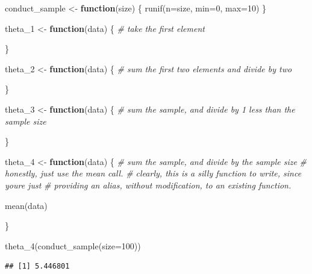 \documentclass[
]{article}
\newenvironment{Shaded}{\begin{snugshade}}{\end{snugshade}}
\newcommand{\AttributeTok}[1]{\textcolor[rgb]{0.77,0.63,0.00}{#1}}
\newcommand{\CommentTok}[1]{\textcolor[rgb]{0.56,0.35,0.01}{\textit{#1}}}
\newcommand{\ControlFlowTok}[1]{\textcolor[rgb]{0.13,0.29,0.53}{\textbf{#1}}}
\newcommand{\DecValTok}[1]{\textcolor[rgb]{0.00,0.00,0.81}{#1}}
\newcommand{\FunctionTok}[1]{\textcolor[rgb]{0.00,0.00,0.00}{#1}}
\newcommand{\NormalTok}[1]{#1}
\newcommand{\OtherTok}[1]{\textcolor[rgb]{0.56,0.35,0.01}{#1}}
\begin{document}
\begin{Shaded}
\begin{Highlighting}[]
\NormalTok{conduct\_sample }\OtherTok{\textless{}{-}} \ControlFlowTok{function}\NormalTok{(size) \{ }
  \FunctionTok{runif}\NormalTok{(}\AttributeTok{n=}\NormalTok{size, }\AttributeTok{min=}\DecValTok{0}\NormalTok{, }\AttributeTok{max=}\DecValTok{10}\NormalTok{)}
\NormalTok{\}}
\end{Highlighting}
\end{Shaded}

\begin{Shaded}
\begin{Highlighting}[]
\NormalTok{theta\_1 }\OtherTok{\textless{}{-}} \ControlFlowTok{function}\NormalTok{(data) \{ }
  \CommentTok{\# take the first element}
  
\NormalTok{\}}

\NormalTok{theta\_2 }\OtherTok{\textless{}{-}} \ControlFlowTok{function}\NormalTok{(data) \{ }
  \CommentTok{\# sum the first two elements and divide by two}
  
\NormalTok{\}}

\NormalTok{theta\_3 }\OtherTok{\textless{}{-}} \ControlFlowTok{function}\NormalTok{(data) \{ }
  \CommentTok{\# sum the sample, and divide by 1 less than the sample size}
  
\NormalTok{\}}

\NormalTok{theta\_4 }\OtherTok{\textless{}{-}} \ControlFlowTok{function}\NormalTok{(data) \{ }
  \CommentTok{\# sum the sample, and divide by the sample size }
  \CommentTok{\# honestly, just use the mean call. }
  \CommentTok{\# clearly, this is a silly function to write, since you\textquotesingle{}re just }
  \CommentTok{\# providing an alias, without modification, to an existing function. }
  
  \FunctionTok{mean}\NormalTok{(data)}
  
\NormalTok{\}}
\end{Highlighting}
\end{Shaded}

\begin{Shaded}
\begin{Highlighting}[]
\FunctionTok{theta\_4}\NormalTok{(}\FunctionTok{conduct\_sample}\NormalTok{(}\AttributeTok{size=}\DecValTok{100}\NormalTok{))}
\end{Highlighting}
\end{Shaded}

\begin{verbatim}
## [1] 5.446801
\end{verbatim}
\end{document}
